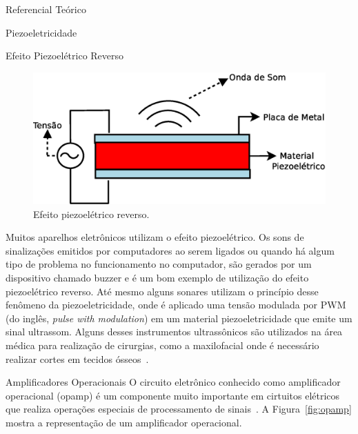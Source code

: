 \begin{chapter}{Referencial Teórico}
\begin{section}{Piezoeletricidade}
\begin{subsection}{Efeito Piezoelétrico Reverso}
\begin{figure}[!h]
	\centering
	\begin{minipage}[c]{\textwidth}
	\centering
	\includegraphics[width=0.9\linewidth]{fig/EfeitoPiezoEletricoReverso}
	\caption{Efeito piezoelétrico reverso.}
	\label{fig:reverso}
	\end{minipage}
\end{figure}

Muitos aparelhos eletrônicos utilizam o efeito piezoelétrico. Os sons de
sinalizações emitidos por computadores ao serem ligados ou quando há algum tipo
de problema no funcionamento no computador, são gerados por um dispositivo
chamado buzzer e é um bom exemplo de utilização do efeito piezoelétrico reverso.
Até mesmo alguns sonares utilizam o princípio desse fenômeno da
piezoeletricidade, onde é aplicado uma tensão modulada por PWM (do inglês,
\textit{pulse with modulation}) em um material piezoeletricidade que emite um
sinal ultrassom. Alguns desses instrumentos ultrassônicos são utilizados na área
médica para realização de cirurgias, como a maxilofacial onde é necessário
realizar cortes em tecidos ósseos~\cite{Carvalho17}.

\end{subsection}

\end{section}

\begin{section}{Amplificadores Operacionais}
O circuito eletrônico conhecido como amplificador operacional (opamp) é um componente
muito importante em cirtuitos elétricos que realiza operações especiais de
processamento de sinais~\cite{Richard2000}. A Figura~\ref{fig:opamp} mostra a
representação de um amplificador operacional.


\end{section}
\end{chapter}
